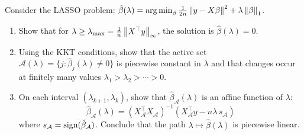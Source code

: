 \begin{exercise}
Consider the LASSO problem:
$\hat{\beta}(\lambda) = \operatorname*{arg\,min}_\beta \frac{1}{2n}\left\| y - X\beta \right\|^2 + \lambda\left\| \beta \right\|_1$.
\begin{enumerate}
  \item Show that for $\lambda \geq \lambda_{\max} = \frac{1}{n}\left\| X^\top y \right\|_\infty$,
        the solution is $\hat{\beta}(\lambda) = 0$.
  \item Using the KKT conditions, show that the active set
        $\mathcal{A}(\lambda) = \{j : \hat{\beta}_j(\lambda) \neq 0\}$ is
        piecewise constant in $\lambda$ and that changes occur at finitely
        many values $\lambda_1 > \lambda_2 > \cdots > 0$.
  \item On each interval $(\lambda_{k+1}, \lambda_k)$, show that
        $\hat{\beta}_{\mathcal{A}}(\lambda)$ is an affine function of $\lambda$:
        \[
          \hat{\beta}_{\mathcal{A}}(\lambda) = (X_{\mathcal{A}}^\top X_{\mathcal{A}})^{-1}
          (X_{\mathcal{A}}^\top y - n\lambda\, s_{\mathcal{A}})
        \]
        where $s_{\mathcal{A}} = \mathrm{sign}(\hat{\beta}_{\mathcal{A}})$.
        Conclude that the path $\lambda \mapsto \hat{\beta}(\lambda)$ is
        piecewise linear.
\end{enumerate}
\end{exercise}
